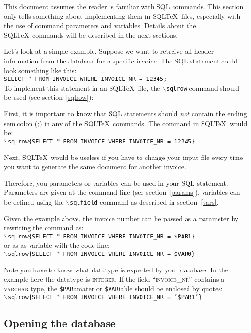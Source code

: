 \documentclass{article}
\newcommand{\bs}{\ensuremath{\backslash}}
\newcommand{\vs}{\vspace{3mm}}
\begin{document}
This document assumes the reader is familiar with SQL commands. This section only tells something about
implementing them in SQL\TeX\ files, especially with the use of command parameters and variables.
Details about the SQL\TeX\ commands will be described in the next sections.

\vs

Let's look at a simple example. Suppose we want to retreive all header information from the database
for a specific invoice. The SQL statement could look something like this: \\
\texttt{SELECT $\ast$ FROM INVOICE WHERE INVOICE\_NR = 12345;}\\
To implement this statement in an SQL\TeX\ file, the \texttt{\bs sqlrow} command should be used (see
section~\ref{sqlrow}):

First, it is important to know that SQL statements should \textit{not} contain the ending semicolon (;) in
any of the SQL\TeX\ commands. The command in SQL\TeX\ would be:\\
\texttt{\bs sqlrow\{SELECT $\ast$ FROM INVOICE WHERE INVOICE\_NR = 12345\}}

Next, SQL\TeX\ would be useless if you have to change your input file every time you want to generate
the same document for another invoice.

\vs

Therefore, you parameters or variables can be used in your SQL statement. Parameters are given at the command
line (see section~\ref{params}), variables can be defined using the \texttt{\bs sqlfield} command as
described in section~\ref{vars}.

Given the example above, the invoice number can be passed as a parameter by rewriting the command as: \\
\texttt{\bs sqlrow\{SELECT $\ast$ FROM INVOICE WHERE INVOICE\_NR = \$PAR1\}} \\
or as as variable with the code line: \\
\texttt{\bs sqlrow\{SELECT $\ast$ FROM INVOICE WHERE INVOICE\_NR = \$VAR0\}}

Note you have to know what datatype is expected by your database. In the example here the datatype is
\textsc{integer}. If the field ``\textsc{invoice\_nr}'' contains a \textsc{varchar} type, the
\texttt{\$PAR}amater or \texttt{\$VAR}iable should be enclosed by quotes: \\
\texttt{\bs sqlrow\{SELECT $\ast$ FROM INVOICE WHERE INVOICE\_NR = '\$PAR1'\}}

\subsection{Opening the database}
\end{document}
